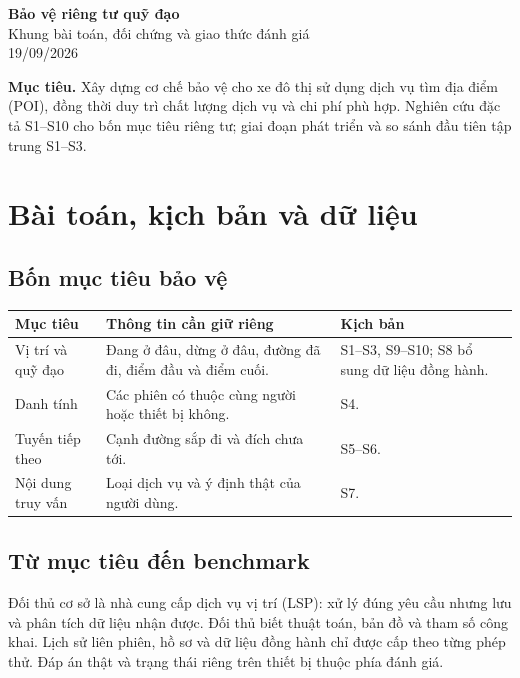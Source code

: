\documentclass[10pt,a4paper]{article}
\begin{document}
\begin{center}
{\LARGE\bfseries\color{ink} Bảo vệ riêng tư quỹ đạo}\\[5pt]
{\large Khung bài toán, đối chứng và giao thức đánh giá}\\[4pt]
{\small 19/09/2026}
\end{center}
\textbf{Mục tiêu.} Xây dựng cơ chế bảo vệ cho xe đô thị sử dụng dịch vụ tìm địa điểm (POI), đồng thời duy trì chất lượng dịch vụ và chi phí phù hợp. Nghiên cứu đặc tả S1--S10 cho bốn mục tiêu riêng tư; giai đoạn phát triển và so sánh đầu tiên tập trung S1--S3.

\section{Bài toán, kịch bản và dữ liệu}
\subsection{Bốn mục tiêu bảo vệ}
\begin{tabularx}{\linewidth}{@{}P{3.1cm}Y P{3.4cm}@{}}
\toprule\textbf{Mục tiêu}&\textbf{Thông tin cần giữ riêng}&\textbf{Kịch bản}\\\midrule
Vị trí và quỹ đạo & Đang ở đâu, dừng ở đâu, đường đã đi, điểm đầu và điểm cuối. & S1--S3, S9--S10; S8 bổ sung dữ liệu đồng hành.\\
Danh tính & Các phiên có thuộc cùng người hoặc thiết bị không. & S4.\\
Tuyến tiếp theo & Cạnh đường sắp đi và đích chưa tới. & S5--S6.\\
Nội dung truy vấn & Loại dịch vụ và ý định thật của người dùng. & S7.\\\bottomrule
\end{tabularx}

\subsection{Từ mục tiêu đến benchmark}
Đối thủ cơ sở là nhà cung cấp dịch vụ vị trí (LSP): xử lý đúng yêu cầu nhưng lưu và phân tích dữ liệu nhận được. Đối thủ biết thuật toán, bản đồ và tham số công khai. Lịch sử liên phiên, hồ sơ và dữ liệu đồng hành chỉ được cấp theo từng phép thử. Đáp án thật và trạng thái riêng trên thiết bị thuộc phía đánh giá.
\end{document}
